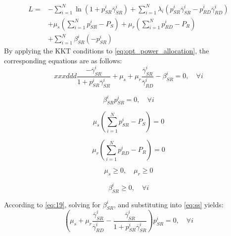 \documentclass[lettersize,journal]{IEEEtran}
\begin{document}
	\begin{equation}
		\begin{aligned}
			L = & - \sum_{i=1}^{N} \ln(1 + p_{SR}^i \bar{\gamma}_{SR}^i) + \sum_{i=1}^{N} \lambda_i (p_{SR}^i \bar{\gamma}_{SR}^i - p_{RD}^i \bar{\gamma}_{RD}^i) \\
			& + \mu_s \left( \sum_{i=1}^{N} p_{SR}^i - P_S \right) + \mu_r \left( \sum_{i=1}^{N} p_{RD}^i - P_R \right) \\
			& + \sum_{i=1}^{N} \beta_{SR}^i (- p_{SR}^i)
		\end{aligned}
	\end{equation}
	By applying the KKT conditions to \eqref{eq:opt_power_allocation}, the corresponding equations are as follows:
	\begin{equation}xxxddd
		\frac{- \overline{\gamma}_{SR}^i}{1 + p_{SR}^i \overline{\gamma}_{SR}^i} + \mu_s + \mu_r \frac{\overline{\gamma}_{SR}^i}{\overline{\gamma}_{RD}^i} - \beta_{SR}^i = 0, \quad \forall i
		\label{eq:19}
	\end{equation}
	
	\begin{equation}
		\beta_{SR}^i p_{SR}^i = 0, \quad \forall i
		\label{eq:ss}
	\end{equation}
	
	\begin{equation}
		\mu_s \left( \sum_{i=1}^{N} p_{SR}^i - P_S \right) = 0
		\label{eq:21}
	\end{equation}
	
	\begin{equation}
		\mu_r \left( \sum_{i=1}^{N} p_{RD}^i - P_R \right) = 0
		\label{eq:22}
	\end{equation}
	
	\begin{equation}
		\mu_s \geq 0, \quad \mu_r \geq 0
		\label{eq:23}
	\end{equation}
	
	\begin{equation}
		\beta_{SR}^i \geq 0, \quad \forall i
		\label{eq:24}
	\end{equation}
	
	According to \eqref{eq:19}, solving for \( \beta_{SR}^i \), and substituting into \eqref{eq:ss} yields:
	\begin{equation}
		\left( \mu_s + \mu_r \frac{\overline{\gamma}_{SR}^i}{\overline{\gamma}_{RD}^i} - \frac{\overline{\gamma}_{SR}^i}{1 + p_{SR}^i \overline{\gamma}_{SR}^i} \right) p_{SR}^i = 0, \quad \forall i
		\label{eq:25}
	\end{equation}
	
\end{document}
